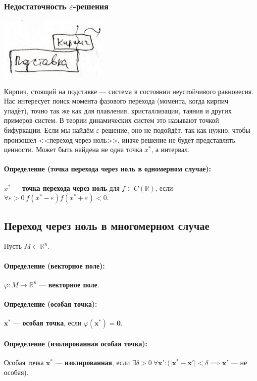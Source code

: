 \subsubsection{Недостаточность $\varepsilon$-решения}
\begin{center}
	\includegraphics[width=5.2cm]{../figures/lection_1/figure_1.png}
\end{center}
Кирпич, стоящий на подставке --- система в состоянии неустойчивого равновесия. Нас интересует поиск момента фазового перехода (момента, когда кирпич упадёт), точно так же как для плавления, кристаллизации, таяния и других примеров систем. В теории динамических систем это называют точкой бифуркации. Если мы найдём $\varepsilon$-решение, оно не подойдёт, так как нужно, чтобы произошёл <<переход через ноль>>, иначе решение не будет представлять ценности. Может быть найдена не одна точка $x^*$, а интервал.
\paragraph{Определение (точка перехода через ноль в одномерном случае):} $x^*$ --- \textbf{точка перехода через ноль} для $f\in C(\mathbb{R})$, если $\forall \varepsilon > 0 \  f(x^*-\varepsilon)f(x^*+\varepsilon) < 0$.
\subsection{Переход через ноль в многомерном случае}
Пусть $M \subset \mathbb{R}^n$.
\paragraph{Определение (векторное поле):} $\varphi:M\rightarrow\mathbb{R}^n$ --- \textbf{векторное поле}.
\paragraph{Определение (особая точка):} $\mathbf{x^*}$ --- \textbf{особая точка}, если $\varphi(\mathbf{x^*})=\mathbf{0}$.
\paragraph{Определение (изолированная особая точка):} Особая точка $\mathbf{x^*}$ --- \textbf{изолированная}, если $\exists \delta > 0 \  \forall \mathbf{x'}: (\vert\mathbf{x^*}-\mathbf{x'}\vert<\delta \implies \mathbf{x'}$ --- не особая).
